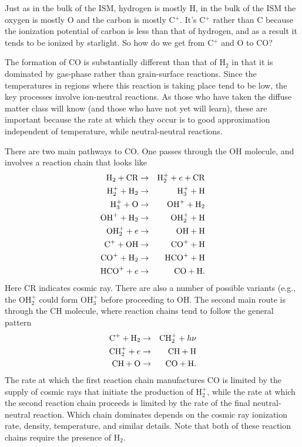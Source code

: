 Just as in the bulk of the ISM, hydrogen is mostly H, in the bulk of the ISM the oxygen is mostly O and the carbon is mostly C$^+$. It's C$^+$ rather than C because the ionization potential of carbon is less than that of hydrogen, and as a result it tends to be ionized by starlight. So how do we get from C$^+$ and O to CO?

The formation of CO is substantially different than that of H$_2$ in that it is dominated by gas-phase rather than grain-surface reactions. Since the temperatures in regions where this reaction is taking place tend to be low, the key processes involve ion-neutral reactions. As those who have taken the diffuse matter class will know (and those who have not yet will learn), these are important because the rate at which they occur is to good approximation independent of temperature, while neutral-neutral reactions.

There are two main pathways to CO. One passes through the OH molecule, and involves a reaction chain that looks like
\begin{eqnarray}
{\rm H}_2 + {\rm CR} & \rightarrow & {\rm H}_2^+ + e + {\rm CR} \\
{\rm H}_2^+ + {\rm H}_2 & \rightarrow & {\rm H}_3^+ + {\rm H} \\
{\rm H}_3^+ + {\rm O} & \rightarrow & {\rm OH}^+ + {\rm H}_2 \\
{\rm OH}^+ + {\rm H}_2 & \rightarrow & {\rm OH}_2^+ + {\rm H} \\
{\rm OH}_2^+ + e & \rightarrow & {\rm OH} + {\rm H} \\
{\rm C}^+ + {\rm OH} & \rightarrow & {\rm CO}^+ + {\rm H} \\
{\rm CO}^+ + {\rm H}_2 & \rightarrow & {\rm HCO}^+ + {\rm H} \\
{\rm HCO}^+ + e & \rightarrow & {\rm CO} + {\rm H}.
\end{eqnarray}
Here CR indicates cosmic ray. There are also a number of possible variants (e.g., the OH$_2^+$ could form OH$_3^+$ before proceeding to OH. The second main route is through the CH molecule, where reaction chains tend to follow the general pattern
\begin{eqnarray}
{\rm C}^+ + {\rm H}_2 & \rightarrow & {\rm CH}_2^+ + h\nu \\
{\rm CH}_2^+ + e & \rightarrow & {\rm CH} + {\rm H} \\
{\rm CH} + {\rm O} & \rightarrow & {\rm CO} + {\rm H}.
\end{eqnarray}
The rate at which the first reaction chain manufactures CO is limited by the supply of cosmic rays that initiate the production of H$_2^+$, while the rate at which the second reaction chain proceeds is limited by the rate of the final neutral-neutral reaction. Which chain dominates depends on the cosmic ray ionization rate, density, temperature, and similar details. Note that both of these reaction chains require the presence of H$_2$. 

